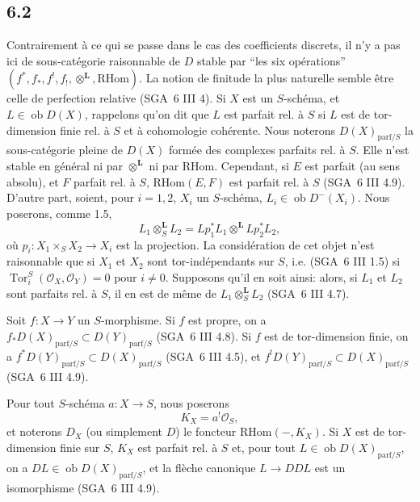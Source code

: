\documentclass[11pt]{article}
\providecommand{\cO}{\mathcal{O}}
\DeclareMathOperator{\Tor}{Tor}
\providecommand{\RHom}{\mathrm{RHom}}
\providecommand{\RHom}{\mathrm{RHom}}
\providecommand{\RHom}{\mathrm R\mathcal{H}om}
\providecommand{\RHom}{\mathrm{RHom}}
\begin{document}
\subsection*{6.2}
Contrairement à ce qui se passe dans le cas des coefficients discrets, il n'y a pas ici de sous-catégorie raisonnable de $D$ stable par ``les six opérations'' $(f^*,f_*,f^!,f_!,\otimes^{\mathbf L},\RHom)$. La notion de finitude la plus naturelle semble être celle de perfection relative (SGA~6 III 4). Si $X$ est un $S$-schéma, et $L\in\operatorname{ob}D(X)$, rappelons qu'on dit que $L$ est parfait rel. à $S$ si $L$ est de tor-dimension finie rel. à $S$ et à cohomologie cohérente. Nous noterons $D(X)_{\mathrm{parf}/S}$ la sous-catégorie pleine de $D(X)$ formée des complexes parfaits rel. à $S$. Elle n'est stable en général ni par $\otimes^{\mathbf L}$ ni par $\RHom$. Cependant, si $E$ est parfait (au sens absolu), et $F$ parfait rel. à $S$, $\RHom(E,F)$ est parfait rel. à $S$ (SGA~6 III 4.9). D'autre part, soient, pour $i=1,2$, $X_i$ un $S$-schéma, $L_i\in\operatorname{ob}D^{-}(X_i)$. Nous poserons, comme 1.5,
\[
L_1\otimes_S^{\mathbf L}L_2=Lp_1^*L_1\otimes^{\mathbf L}Lp_2^*L_2,
\]
où $p_i:X_1\times_SX_2\to X_i$ est la projection. La considération de cet objet n'est raisonnable que si $X_1$ et $X_2$ sont tor-indépendants sur $S$, i.e. (SGA~6 III 1.5) si $\Tor_i^S(\cO_X,\cO_Y)=0$ pour $i\ne0$. Supposons qu'il en soit ainsi: alors, si $L_1$ et $L_2$ sont parfaits rel. à $S$, il en est de même de $L_1\otimes_S^{\mathbf L}L_2$ (SGA~6 III 4.7).

Soit $f:X\to Y$ un $S$-morphisme. Si $f$ est propre, on a $f_*D(X)_{\mathrm{parf}/S}\subset D(Y)_{\mathrm{parf}/S}$ (SGA~6 III 4.8). Si $f$ est de tor-dimension finie, on a $f^*D(Y)_{\mathrm{parf}/S}\subset D(X)_{\mathrm{parf}/S}$ (SGA~6 III 4.5), et $f^!D(Y)_{\mathrm{parf}/S}\subset D(X)_{\mathrm{parf}/S}$ (SGA~6 III 4.9).

Pour tout $S$-schéma $a:X\to S$, nous poserons
\begin{equation}
\tag{6.2.1}
K_X=a^!\cO_S,
\end{equation}
et noterons $D_X$ (ou simplement $D$) le foncteur $\RHom(-,K_X)$. Si $X$ est de tor-dimension finie sur $S$, $K_X$ est parfait rel. à $S$ et, pour tout $L\in\operatorname{ob}D(X)_{\mathrm{parf}/S}$, on a $DL\in\operatorname{ob}D(X)_{\mathrm{parf}/S}$, et la flèche canonique $L\to DDL$ est un isomorphisme (SGA~6 III 4.9).
\end{document}
